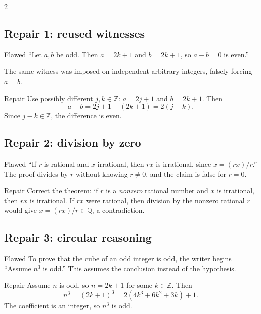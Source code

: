 \documentclass[10pt]{article}
\newcommand{\Z}{\mathbb Z}
\newcommand{\Q}{\mathbb Q}
\begin{document}
\begin{multicols}{2}
\raggedcolumns
\subsection*{Repair 1: reused witnesses}

\begin{warningbox}{Flawed}
``Let $a,b$ be odd. Then $a=2k+1$ and $b=2k+1$, so $a-b=0$ is even.''

The same witness was imposed on independent arbitrary integers, falsely forcing
$a=b$.
\end{warningbox}

\begin{workedbox}{Repair}
Use possibly different $j,k\in\Z$: $a=2j+1$ and $b=2k+1$. Then
\[
 a-b=2j+1-(2k+1)=2(j-k).
\]
Since $j-k\in\Z$, the difference is even.
\end{workedbox}

\subsection*{Repair 2: division by zero}

\begin{warningbox}{Flawed}
``If $r$ is rational and $x$ irrational, then $rx$ is irrational, since
$x=(rx)/r$.'' The proof divides by $r$ without knowing $r\ne0$, and the claim
is false for $r=0$.
\end{warningbox}

\begin{workedbox}{Repair}
Correct the theorem: if $r$ is a \emph{nonzero} rational number and $x$ is
irrational, then $rx$ is irrational. If $rx$ were rational, then division by
the nonzero rational $r$ would give $x=(rx)/r\in\Q$, a contradiction.
\end{workedbox}

\columnbreak
\subsection*{Repair 3: circular reasoning}

\begin{warningbox}{Flawed}
To prove that the cube of an odd integer is odd, the writer begins ``Assume
$n^3$ is odd.'' This assumes the conclusion instead of the hypothesis.
\end{warningbox}

\begin{workedbox}{Repair}
Assume $n$ is odd, so $n=2k+1$ for some $k\in\Z$. Then
\[
n^3=(2k+1)^3
=2(4k^3+6k^2+3k)+1.
\]
The coefficient is an integer, so $n^3$ is odd.
\end{workedbox}


\end{multicols}
\end{document}
